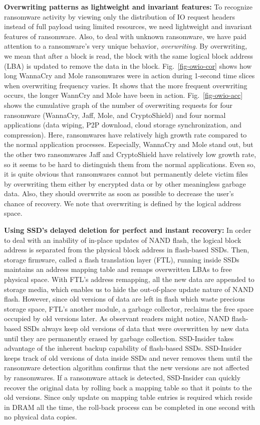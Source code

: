 \documentclass[conference]{IEEEtran}
\newcommand{\ours}{SSD-Insider}
\begin{document}
{\bf Overwriting patterns as lightweight and invariant features:}
To recognize ransomware activity by viewing only the distribution of IO request headers 
instead of full payload using limited resources, we need lightweight and invariant features of ransomware.
Also, to deal with unknown ransomware, we have paid attention to a ransomware's very unique behavior,
{\em overwriting}. By overwriting, we mean that after a block is read, the block with the same logical
block address (LBA) is updated to remove the data in the block.
Fig.~\ref{fig-owio-cor} shows how long WannaCry and Mole ransomwares were in action 
during 1-second time slices when overwriting frequency varies. It shows that the more frequent overwriting occurs, 
the longer WannCry and Mole have been in action.
Fig.~\ref{fig-owio-acc} shows the cumulative graph of the number of overwriting requests for four ransomware 
(WannaCry, Jaff, Mole, and CryptoShield) and four normal applications (data wiping, P2P download, 
cloud storage synchronization, and compression). Here, ransomwares have relatively high growth rate compared to the normal
application processes. Especially, WannaCry and Mole stand out, but the other two ransomwares Jaff 
and CryptoShield have relatively low growth rate, so it seems to be hard to distinguish them from the normal
applications. Even so, it is quite obvious that ransomwares cannot but permanently delete victim files by 
overwriting them either by encrypted data or by other meaningless garbage data. Also, they should overwrite
as soon as possible to decrease the user's chance of recovery. We note that overwriting is defined by the logical
address space.

{\bf Using SSD's delayed deletion for perfect and instant recovery:}
In order to deal with an inability of in-place updates of NAND flash, the logical block
address is separated from the physical block address in flash-based SSDs.
Then, storage firmware, called a flash translation layer (FTL), running inside SSDs
maintains an address mapping table and remaps overwritten LBAs to free physical
space.  With FTL's address remapping, all the new data are appended to storage
media, which  enables us to hide the out-of-place update nature of NAND flash.
However, since old versions of data are left in flash which waste precious
storage space, FTL's another module, a garbage collector, reclaims the free
space occupied by old versions later.  As observant readers might notice, NAND
flash-based SSDs always keep old versions of data that were overwritten by new
data until they are permanently erased by garbage collection. \ours{} takes
advantage of the inherent backup capability of flash-based SSDs. \ours{} keeps
track of old versions of data inside SSDs and never removes them until the
ransomware detection algorithm confirms that the new versions are not affected
by ransomwares. If a ransomware attack is detected, \ours{} can quickly recover
the original data by rolling back a mapping table so that it points to the old
versions.  Since only update on mapping table entries is required which
reside in DRAM all the time, the roll-back process can be completed in one
second with no physical data copies.
\end{document}
